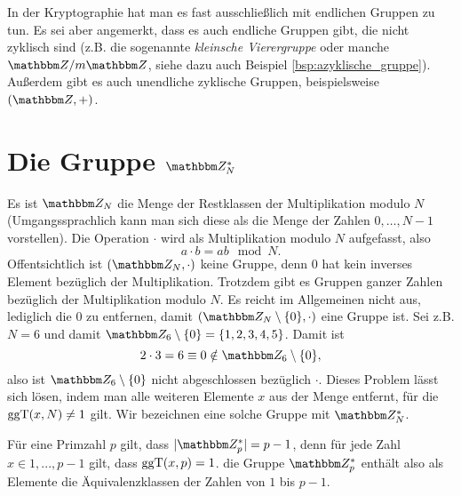 In der Kryptographie hat man es fast ausschließlich mit endlichen
Gruppen zu tun. Es sei aber angemerkt, dass es auch endliche Gruppen
gibt, die nicht zyklisch sind (z.B. die sogenannte \emph{kleinsche
Vierergruppe} oder manche $\Z{}/m\Z{}$, siehe dazu auch Beispiel \ref{bsp:azyklische_gruppe}). Außerdem
gibt es auch unendliche zyklische Gruppen, beispielsweise $(\Z{},+)$.
\section{Die Gruppe $\Z{N}^*$}
Es ist $\Z{N}$ die Menge der Restklassen der Multiplikation modulo $N$
(Umgangssprachlich kann man sich diese als die Menge der Zahlen
${0,\dots , N-1}$ vorstellen). Die Operation $\cdot$ wird als
Multiplikation modulo $N$ aufgefasst, also 
\[
a \cdot b = ab \mod N.
\]
 Offentsichtlich
ist $(\Z{N}, \cdot)$ keine Gruppe, denn $0$ hat kein inverses Element
bezüglich der Multiplikation.
Trotzdem gibt es Gruppen ganzer Zahlen bezüglich der
Multiplikation modulo $N$. Es reicht im Allgemeinen nicht aus, lediglich die $0$ zu
entfernen, damit $(\Z{N}\setminus \{0\}, \cdot)$ eine Gruppe ist. Sei
z.B. $N=6$ und damit $\Z{6}\setminus \{0\} = \{1,2,3,4,5\}$. Damit ist  
\[
2 \cdot 3 = 6 \equiv 0 \notin \Z{6}\setminus \{0\},
\]
also ist $\Z{6}\setminus \{0\}$ nicht abgeschlossen bezüglich $\cdot$. 
Dieses Problem lässt sich lösen, indem man alle weiteren Elemente $x$ aus
der Menge entfernt, für die $\operatorname{ggT}(x, N)\neq 1$ gilt. Wir bezeichnen eine
solche Gruppe mit $\Z{N}^*$. 

Für eine Primzahl $p$ gilt, dass  $|\Z{p}^*|= p-1$, denn für jede Zahl $x\in
{1,..., p-1}$ gilt, dass $\operatorname{ggT}(x, p)=1$. die Gruppe $\Z{p}^*$ enthält
also als Elemente die Äquivalenzklassen der Zahlen von $1$ bis $p-1$.

